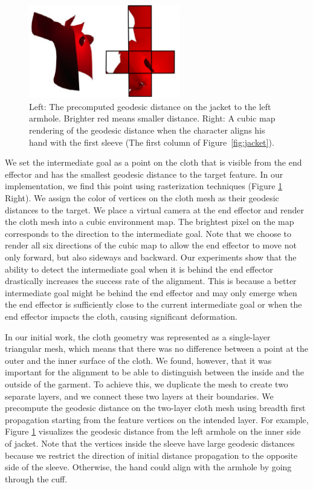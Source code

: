 \begin{figure}[!t]
  \centering
  \includegraphics[width=2.6in]{images/geodesic}
  \caption{Left: The precomputed geodesic distance on the jacket to the left armhole. Brighter red means smaller distance. Right: A cubic map rendering of the geodesic distance when the character aligns his hand with the first sleeve (The first column of Figure~\ref{fig:jacket}).}
  \label{fig:geodesic}
\end{figure}


We set the intermediate goal as a point on the cloth that is visible from the end effector and has the smallest geodesic distance to the target feature. In our implementation, we find this point using rasterization techniques (Figure \ref{fig:geodesic} Right). We assign the color of vertices on the cloth mesh as their geodesic distances to the target. We place a virtual camera at the end effector and render the cloth mesh into a cubic environment map. The brightest pixel on the map corresponds to the direction to the intermediate goal. Note that we choose to render all six directions of the cubic map to allow the end effector to move not only forward, but also sideways and backward. Our experiments show that the ability to detect the intermediate goal when it is behind the end effector drastically increases the success rate of the alignment. This is because a better intermediate goal might be behind the end effector and may only emerge when the end effector is sufficiently close to the current intermediate goal or when the end effector impacts the cloth, causing significant deformation.

In our initial work, the cloth geometry was represented as a single-layer triangular mesh, which means that there was no difference between a point at the outer and the inner surface of the cloth. We found, however, that it was important for the alignment to be able to distinguish between the inside and the outside of the garment.  To achieve this, we duplicate the mesh to create two separate layers, and we connect these two layers at their boundaries. We precompute the geodesic distance on the two-layer cloth mesh using breadth first propagation starting from the feature vertices on the intended layer. For example, Figure \ref{fig:geodesic} visualizes the geodesic distance from the left armhole on the inner side of jacket. Note that the vertices inside the sleeve have large geodesic distances because we restrict the direction of initial distance propagation to the opposite side of the sleeve. Otherwise, the hand could align with the armhole by going through the cuff. 


